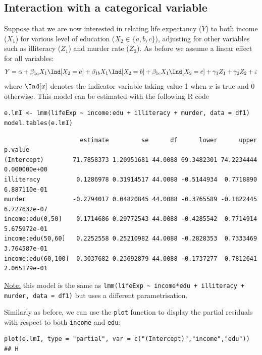 \documentclass[12pt]{article}
\begin{document}
\subsection{Interaction with a categorical variable}
\label{sec:orga396bef}

Suppose that we are now interested in relating life expectancy (\(Y\))
to both income (\(X_1\)) for various level of education (\(X_2 \in
\{a,b,c\}\)), adjusting for other variables such as illiteracy
(\(Z_1\)) and murder rate (\(Z_2\)). As before we assume a linear
effect for all variables:
\begin{align*}
Y = \alpha + \beta_{1a} X_1 \Ind[X_2=a] + \beta_{1b} X_1 \Ind[X_2=b] + \beta_{1c} X_1 \Ind[X_2=c] + \gamma_1 Z_1 + \gamma_2 Z_2 + \varepsilon
\end{align*}
where \(\Ind[x]\) denotes the indicator variable taking value 1 when
\(x\) is true and 0 otherwise. This model can be estimated with the
following R code
\lstset{language=r,label= ,caption= ,captionpos=b,numbers=none}
\begin{lstlisting}
e.lmI <- lmm(lifeExp ~ income:edu + illiteracy + murder, data = df1)
model.tables(e.lmI)
\end{lstlisting}

\begin{verbatim}
                     estimate         se      df      lower      upper      p.value
(Intercept)        71.7858373 1.20951681 44.0088 69.3482301 74.2234444 0.000000e+00
illiteracy          0.1286978 0.31914517 44.0088 -0.5144934  0.7718890 6.887110e-01
murder             -0.2794017 0.04820845 44.0088 -0.3765589 -0.1822445 6.727632e-07
income:edu(0,50]    0.1714686 0.29772543 44.0088 -0.4285542  0.7714914 5.675972e-01
income:edu(50,60]   0.2252558 0.25210982 44.0088 -0.2828353  0.7333469 3.764587e-01
income:edu(60,100]  0.3037682 0.23692879 44.0088 -0.1737277  0.7812641 2.065179e-01
\end{verbatim}


\uline{Note:} this model is the same as \texttt{lmm(lifeExp \textasciitilde{} income*edu +
illiteracy + murder, data = df1)} but uses a different parametrisation.

\bigskip

Similarly as before, we can use the \texttt{plot} function to display the
partial residuals with respect to both \texttt{income} and \texttt{edu}:
\lstset{language=r,label= ,caption= ,captionpos=b,numbers=none}
\begin{lstlisting}
plot(e.lmI, type = "partial", var = c("(Intercept)","income","edu")) ## H
\end{lstlisting}
\end{document}
